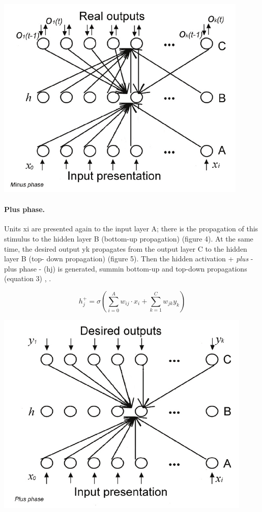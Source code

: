 \begin{center} 
\includegraphics{img/generec_minus_phase.png} \citet{orru2008sabio} 
\end{center} 

\paragraph{Plus phase.} Units xi are presented again to the input layer A; there is the propagation of this stimulus to the hidden layer B (bottom-up propagation) (figure 4). At the same time, the desired output yk propagates from the output layer C to the hidden layer B (top- down propagation) (figure 5). Then the hidden activation + \emph{plus} - plus phase - (hj) is generated, summin bottom-up and top-down propagations (equation 3) \citet{o1996bio}, \citet{orru2008sabio}.

$$h_j^+ = \sigma\left( \sum_{i=0}^A w_{ij} \cdot x_i + \sum_{k=1}^C w_{jk} y_k \right)$$

\begin{center} 
\includegraphics{img/generec_plus_phase.png} \citet{orru2008sabio} 
\end{center} 

